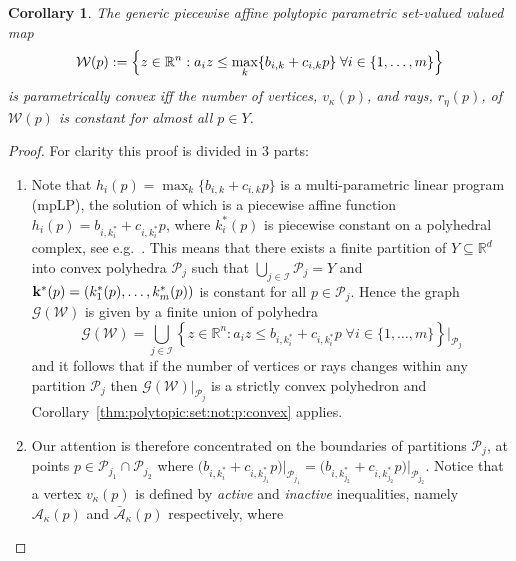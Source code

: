 \documentclass{elsarticle}
\newcounter{thmcount}
\newtheorem{cor}[thmcount]{Corollary}
\theoremstyle{remark}
\theoremstyle{definition}
\begin{document}
%
\begin{cor}\label{thm:p:convexity:PWA:set:constant:num:verts}
The generic piecewise affine polytopic parametric set-valued valued map 
%
\begin{equation}\label{eq:definition:PWA:polytopic:set:general}
  \mathcal W(p) := \Bigl\{z\in\mathbb R^n: a_i z \leq \max_{k}\{b_{i,k} + c_{i,k}p\} \; \forall i\in\{1,\dots,m\} \Bigr\}
\end{equation}
%
is parametrically convex iff the number of vertices, $v_\kappa(p)$, and rays, $r_\eta(p)$, of~$\mathcal W(p)$ is constant for almost all $p\in Y$.
\end{cor}
%
\begin{proof}
For clarity this proof is divided in 3 parts:
\begin{enumerate}
\item Note that $h_i(p) = \max_{k} \{b_{i,k} + c_{i,k}p\}$ is a multi-parametric linear program (mpLP),
the solution of which is a piecewise affine function $h_i(p) = b_{i,k^\ast_i} + c_{i,k^\ast_i}p$, where $k^\ast_i(p)$ is piecewise constant on a polyhedral complex, see e.g.~\cite{spjotvold:2005}.
%
This means that there exists a finite partition of $Y\subseteq\mathbb R^d$ into convex polyhedra 
$\mathcal P_j$ such that $\bigcup_{j\in\mathcal I} \mathcal P_j = Y$ and 
${\bf{k}}^\ast(p) = (k_1^\ast(p),\dots,k_m^\ast(p))$ is constant for all $p \in \mathcal P_j$.
%
Hence the graph $\mathscr G(\mathcal W)$ is given by a finite union of polyhedra
%
\begin{equation*}
  \mathscr G(\mathcal W) = \bigcup_{j\in\mathcal I} \left\{z\in\mathbb R^n: a_i z \leq b_{i,k_i^\ast} + c_{i,k_i^\ast}p \; \forall i \in\{1,\dots,m\} \right\}\bigr\vert_{\mathcal P_{j}}
\end{equation*}
%
and it follows that if the number of vertices or rays changes within any partition $\mathcal P_j$ then $\mathscr
G(\mathcal W)\vert_{\mathcal P_j}$ is a strictly convex polyhedron and Corollary~\ref{thm:polytopic:set:not:p:convex} applies.
%
\item Our attention is therefore concentrated on the boundaries of partitions $\mathcal P_j$, at points $p\in\mathcal P_{j_1} \cap \mathcal P_{j_2}$ where 
$\bigl(b_{i,k_i^\ast} + c_{i,k_{j_1}^\ast} p\bigr)\bigr\rvert_{\mathcal P_{j_1}} = 
\bigl(b_{i,k_{j_2}^\ast} + c_{i,k_{j_2}^\ast} p\bigr)\bigr\rvert_{\mathcal P_{j_2}}$.
%
Notice that a vertex $v_\kappa(p)$ is defined by \emph{active} and \emph{inactive} inequalities, namely $\mathcal A_\kappa(p)$ and
$\bar{\mathcal A}_\kappa(p)$ respectively, where

\end{enumerate}
\end{proof}
\end{document}

